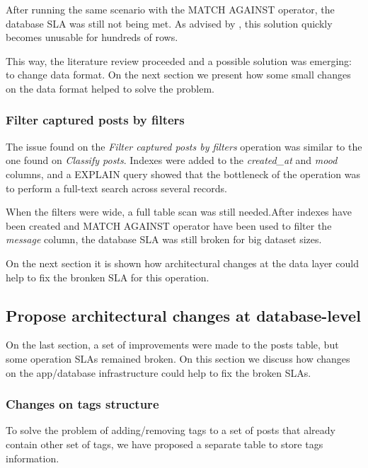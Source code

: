 After running the same scenario with the MATCH AGAINST operator, the database SLA was still not being met. As advised by \cite{stackoverflowmatch}, this solution quickly becomes unusable for hundreds of rows. 

This way, the literature review proceeded and a possible solution was emerging: to change data format. On the next section we present how some small changes on the data format helped to solve the problem.  



\subsubsection{Filter captured posts by filters}
The issue found on the \textit{Filter captured posts by filters} operation was similar to the one found on \textit{Classify posts}. Indexes were added to the \textit{created\_at} and \textit{mood} columns, and a EXPLAIN query showed that the bottleneck of the operation was to perform a full-text search across several records. 

When the filters were wide, a full table scan was still needed.After indexes have been created and MATCH AGAINST operator have been used to filter the \textit{message} column, the database SLA was still broken for big dataset sizes. 

On the next section it is shown how architectural changes at the data layer could help to fix the bronken SLA for this operation. 














\clearpage
\subsection{Propose architectural changes at database-level}

On the last section, a set of improvements were made to the posts table, but some operation SLAs remained broken. On this section we discuss how changes on the app/database infrastructure could help to fix the broken SLAs.

\subsubsection{Changes on tags structure}
To solve the problem of adding/removing tags to a set of posts that already contain other set of tags, we have proposed a separate table to store tags information. 


